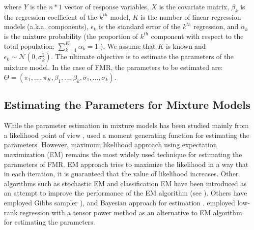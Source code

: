 \documentclass[12pt]{article}
\begin{document}

\noindent 
where $Y$ is the $n*1$ vector of response variables, $X$ is the covariate matrix, $\beta_k$ is the regression coefficient of the $k^{th}$ model, $K$ is the number of linear regression models (a.k.a. components), $\epsilon_k$ is the standard error of the $k^{th}$ regression, and $\alpha_k$ is the mixture probability (the proportion of $k^{th}$ component with respect to the total population; $\sum_{k=1}^{K} \alpha_k=1$ ). We assume that $K$ is known and $\epsilon_k \sim \mathcal{N}(0,\sigma_k^2)$. The ultimate objective is to estimate the parameters of the mixture model. In the case of FMR, the parameters to be estimated are: $\Theta = (\pi_1, \dots , \pi_K, \beta_1, \dots, \beta_k, \sigma_1, \dots, \sigma_k)$.

\subsection{Estimating the Parameters for Mixture Models}
While the parameter estimation in mixture models has been studied mainly from a likelihood point of view \citep{de1989mixtures}, \citep{quandt1978estimating} used a moment generating function for estimating the parameters. However, maximum likelihood approach using expectation maximization (EM) \citep{dempster1977maximum} remains the most widely used technique for estimating the parameters of FMR. EM approach tries to maximize the likelihood in a way that in each iteration, it is guaranteed that the value of likelihood increases. 
Other algorithms such as stochastic EM \citep{celeux1985sem} and classification EM \citep{celeux1992classification} have been introduced as an attempt to improve the performance of the EM algorithm (see \citep{faria2010fitting}). Others have employed Gibbs sampler \citep{diebolt1994estimation}), and Bayesian approach for estimation \citep{hurn2003estimating}. \citep{chaganty2013spectral} employed low-rank regression with a tensor power method as an alternative to EM algorithm for estimating the parameters. 
\end{document}
